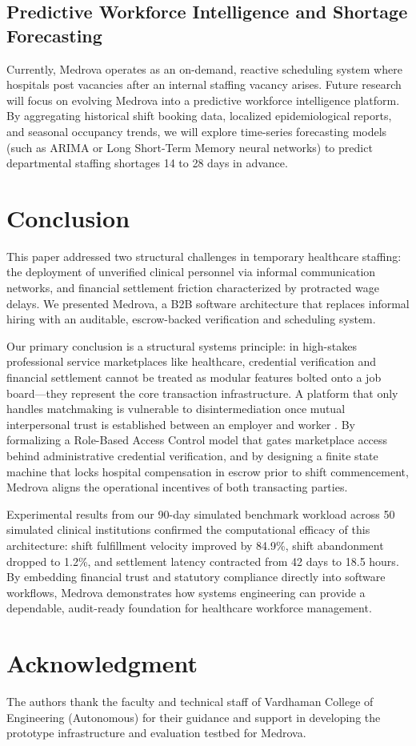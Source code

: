 \documentclass[conference]{IEEEtran}
\begin{document}
\subsection{Predictive Workforce Intelligence and Shortage Forecasting}
Currently, Medrova operates as an on-demand, reactive scheduling system where hospitals post vacancies after an internal staffing vacancy arises. Future research will focus on evolving Medrova into a predictive workforce intelligence platform. By aggregating historical shift booking data, localized epidemiological reports, and seasonal occupancy trends, we will explore time-series forecasting models (such as ARIMA or Long Short-Term Memory neural networks) to predict departmental staffing shortages 14 to 28 days in advance.

\section{Conclusion}
This paper addressed two structural challenges in temporary healthcare staffing: the deployment of unverified clinical personnel via informal communication networks, and financial settlement friction characterized by protracted wage delays. We presented Medrova, a B2B software architecture that replaces informal hiring with an auditable, escrow-backed verification and scheduling system.

Our primary conclusion is a structural systems principle: in high-stakes professional service marketplaces like healthcare, credential verification and financial settlement cannot be treated as modular features bolted onto a job board---they represent the core transaction infrastructure. A platform that only handles matchmaking is vulnerable to disintermediation once mutual interpersonal trust is established between an employer and worker \cite{rochet2006two, gu2021trust}. By formalizing a Role-Based Access Control model that gates marketplace access behind administrative credential verification, and by designing a finite state machine that locks hospital compensation in escrow prior to shift commencement, Medrova aligns the operational incentives of both transacting parties. 

Experimental results from our 90-day simulated benchmark workload across 50 simulated clinical institutions confirmed the computational efficacy of this architecture: shift fulfillment velocity improved by 84.9\%, shift abandonment dropped to 1.2\%, and settlement latency contracted from 42 days to 18.5 hours. By embedding financial trust and statutory compliance directly into software workflows, Medrova demonstrates how systems engineering can provide a dependable, audit-ready foundation for healthcare workforce management.

\section*{Acknowledgment}
The authors thank the faculty and technical staff of Vardhaman College of Engineering (Autonomous) for their guidance and support in developing the prototype infrastructure and evaluation testbed for Medrova.



\end{document}

